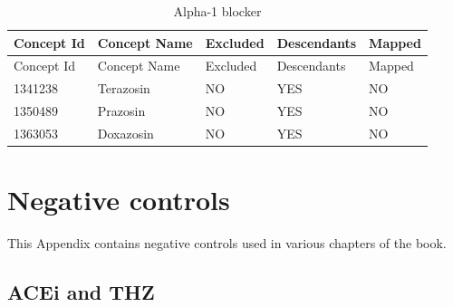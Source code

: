 \documentclass[11pt]{book}
\theoremstyle{definition}
\theoremstyle{definition}
\theoremstyle{definition}
\theoremstyle{remark}
\begin{document}
\begin{longtable}[]{@{}lllll@{}}
\caption{\label{tab:A1BUseA1Bs} Alpha-1 blocker}\tabularnewline
\toprule
Concept Id & Concept Name & Excluded & Descendants &
Mapped\tabularnewline
\midrule
\endfirsthead
\toprule
Concept Id & Concept Name & Excluded & Descendants &
Mapped\tabularnewline
\midrule
\endhead
1341238 & Terazosin & NO & YES & NO\tabularnewline
1350489 & Prazosin & NO & YES & NO\tabularnewline
1363053 & Doxazosin & NO & YES & NO\tabularnewline
\bottomrule
\end{longtable}

\chapter{Negative controls}\label{NegativeControlsAppendix}

This Appendix contains negative controls used in various chapters of the
book.

\section{ACEi and THZ}\label{AceiThzNsc}
\end{document}
